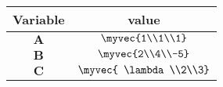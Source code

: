 \begin{tabular}[12pt]{ |c| c|}
    \hline
    \textbf{Variable} & \textbf{value}\\ 
    \hline
    $\mathbf{A}$ & $\myvec{1\\1\\1}$\\
    \hline
    $\mathbf{B}$ & $\myvec{2\\4\\-5}$\\
    \hline
    $\mathbf{C}$ & $\myvec{ \lambda\\2\\3}$\\
    \hline
    \end{tabular}